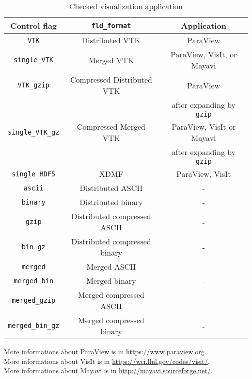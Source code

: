 \begin{table}[htp]
\caption{Checked visualization application}
\label{table:Viz_app}
\begin{center} 
\begin{tabular}{|c|c|c|}
\hline
Control flag & \verb|fld_format| & Application \\ \hline \hline
\verb|VTK| & Distributed VTK & ParaView \\ \hline
\verb|single_VTK| & Merged VTK & ParaView, VisIt, or Mayavi \\ \hline
\verb|VTK_gzip| & Compressed Distributed VTK & ParaView \\
 & & after expanding by {\tt gzip} \\ \hline
\verb|single_VTK_gz| & Compressed Merged VTK & ParaView, VisIt or Mayavi \\
 & &  after expanding by {\tt gzip} \\ \hline
\verb|single_HDF5| & XDMF   & ParaView, VisIt   \\ \hline
\verb|ascii| & Distributed ASCII & - \\
\verb|binary| & Distributed binary & - \\
\verb|gzip| & Distributed compressed ASCII & - \\
\verb|bin_gz| & Distributed compressed binary & - \\
\verb|merged| & Merged ASCII & - \\
\verb|merged_bin| & Merged binary & - \\
\verb|merged_gzip| & Merged compressed ASCII & - \\
\verb|merged_bin_gz| & Merged compressed binary & - \\ \hline
\end{tabular}
\label{table:fld_to_vtk}
\end{center}
More informations about ParaView is in \url{https://www.paraview.org}. \\
More informations about VisIt is in \url{https://wci.llnl.gov/codes/visit/}. \\
More informations about Mayavi is in \url{http://mayavi.sourceforge.net/}. \\
\end{table}
%

